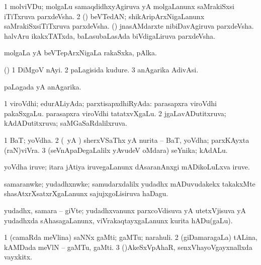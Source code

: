 {\bentry
{} 
\gl{\nA}
\expl{}
\bmng
\bnum
\num{1} molviVDu; molgaLu samaqdidhxyAgiruva yA molgaLanunx saMrakiSxsi iTiTxruva parxdeVsha. 
\num{2} (\ca) beVTedAN; shikAripArxNigaLanunx saMrakiSxsiTiTxruva parxdeVsha. 
 (\rUpa) 
\banum
{} jnasAMdarxte nibiDavAgiruva parxdeVsha. 
 halvAru ikakxTATxda, baLasubaLasAda biVdigaLiruva parxdeVsha. 
\eanum
\numie
\enum
\emng
\eentry

\bentry
{} 
\gl{\nA}
\expl{}
\bmng
molgaLa yA beVTepArxNigaLa rakaSxka, pAlka. 
\emng
\eentry

\bentry
{} 
\gl{\nA}
\expl{}
\bmng
(\AseTxrXV) 
\bnum
\num{1} DiMgoV nAyi. 
\num{2} paLagisida kudure. 
\num{3} anAgarika AdivAsi. 
\enum
\emng
\eentry

\bentry
{} 
\gl{\gu}
\expl{}
\bmng
paLagada yA anAgarika. 
\emng
\eentry

\bentry
{} 
\gl{\gu}
\expl{}
\bmng
\bnum
\num{1} viroVdhi; edurALiyAda; parxtisapxdhiRyAda:  parasapxra viroVdhi pakaSxgaLu.  parasapxra viroVdhi tatatxvXgaLu. 
\num{2} jgaLavADutitxruva; kAdADutitxruva; saMGaSaRdalilxruva. 
\enum
\emng
\eentry

\bentry
{} 
\gl{\nA}
\expl{}
\bmng
\bnum
\num{1} BaT; yoVdha. 
\num{2} (\rUpa\ yA \kAparx) sherxVSaThx yA nurita -- BaT, yoVdha; parxKAyxta (raN)viVra. 
\num{3} (seVnApaDegaLalilx yAvudeV oMdara) seYnika; kAdALu. 
\enum
\emng
\eentry

\bentry
{} 
\gl{\nA}
\expl{}
\bmng
yoVdha iruve; itara jAtiya iruvegaLanunx dAsaranAnxgi mADikoLuLxva iruve. 
\emng
\eentry

\bentry
{} 
\gl{\nA}
\expl{}
\bmng
samaranwke; yudadhxnwke; samudarxdalilx yudadhx mADuvudakekx takakxMte shasAtxrXsatxrXgaLanunx sajujxgoLisiruva haDagu. 
\emng
\eentry

\bentry
{} 
\gl{\nA}
\expl{}
\bmng
yudadhx, samara -- giVte; yudadhxvanunx parxcoVdisuva yA utetxVjisuva yA yudadhxda sAhasagaLanunx, viVrakaqtayxgaLanunx kurita hADu(gaLu). 
\emng
\eentry

\bentry
{} 
\gl{\nA}
\expl{}
\bmng
\bnum
\num{1} (camaRda meVlina) saNNx gaMti; gaMTu; narahuli. 
\num{2} (giDamaragaLa) tALina, kAMDada meVlN -- gaMTu, gaMti. 
\num{3} (\AmA)AkeSxVpAhaR, senxVhayoVgayxnallxda vayxkitx. 
\enum
\emng

}
